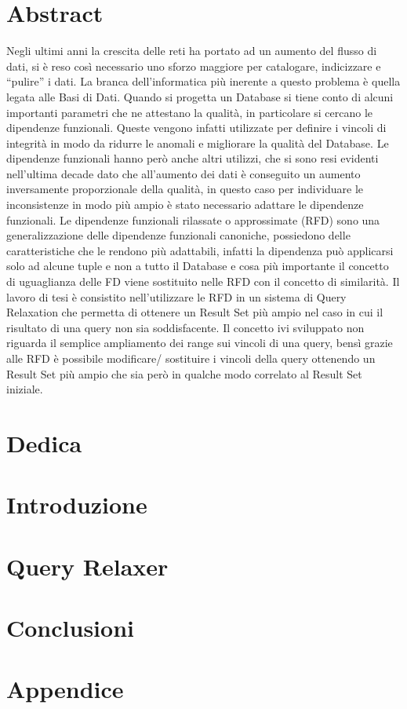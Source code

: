 \documentclass[12pt,oneside]{report}
\begin{document}

\chapter{Abstract}
Negli ultimi anni la crescita delle reti ha portato ad un aumento del flusso di dati, si è reso così necessario uno sforzo maggiore per catalogare, indicizzare e “pulire” i  dati. 
La branca dell’informatica più inerente a questo problema è quella legata alle Basi di Dati. 
Quando si progetta un Database si tiene conto di alcuni importanti parametri che ne attestano la qualità, in particolare si cercano le dipendenze funzionali. Queste vengono infatti utilizzate per definire i vincoli di integrità in modo da ridurre le anomali e migliorare la qualità del Database.
Le dipendenze funzionali hanno però anche altri utilizzi, che si sono resi evidenti nell’ultima decade dato che all’aumento dei dati è conseguito un aumento inversamente proporzionale della qualità, in questo caso per individuare le inconsistenze in modo più ampio è stato necessario adattare le dipendenze funzionali.
Le dipendenze funzionali rilassate o approssimate (RFD) sono una generalizzazione delle dipendenze funzionali canoniche, possiedono delle caratteristiche che le rendono più adattabili, infatti la dipendenza può applicarsi solo ad alcune tuple e non a tutto il Database e cosa più importante il concetto di uguaglianza delle FD viene sostituito nelle RFD con il concetto di similarità. 
Il lavoro di tesi è consistito nell’utilizzare le RFD in un sistema di Query Relaxation che permetta di ottenere un Result Set più ampio nel caso in cui il risultato di una query non sia soddisfacente.
Il concetto ivi sviluppato non riguarda il semplice ampliamento dei range sui vincoli di una query, bensì grazie alle RFD è possibile modificare/ sostituire i vincoli della query ottenendo un Result Set più ampio che sia però in qualche modo correlato al Result Set iniziale.

\chapter*{Dedica}


\tableofcontents

\chapter{Introduzione}


\chapter{Query Relaxer}


\chapter{Conclusioni}


\appendix
\chapter{Appendice}


\listoffigures
\listoftables


\end{document}
